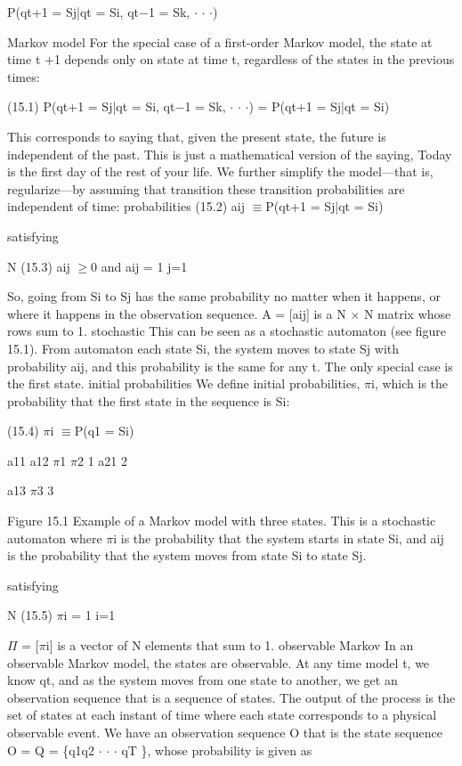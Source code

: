 P(qt+1 = Sj|qt = Si, qt$-$1 = Sk, $\cdot$ $\cdot$ $\cdot$)

Markov model For the special case of a first-order Markov model, the state at time t +1 depends only on state at time t, regardless of the states in the previous times:

(15.1) P(qt+1 = Sj|qt = Si, qt$-$1 = Sk, $\cdot$ $\cdot$ $\cdot$) = P(qt+1 = Sj|qt = Si)

This corresponds to saying that, given the present state, the future is independent of the past. This is just a mathematical version of the saying, Today is the first day of the rest of your life. We further simplify the model---that is, regularize---by assuming that transition these transition probabilities are independent of time: probabilities (15.2) aij $\equiv$P(qt+1 = Sj|qt = Si)

satisfying

N (15.3) aij $\geq$0 and aij = 1 j=1

So, going from Si to Sj has the same probability no matter when it happens, or where it happens in the observation sequence. A = [aij] is a N $\times$ N matrix whose rows sum to 1. stochastic This can be seen as a stochastic automaton (see figure 15.1). From automaton each state Si, the system moves to state Sj with probability aij, and this probability is the same for any t. The only special case is the first state. initial probabilities We define initial probabilities, $\pi$i, which is the probability that the first state in the sequence is Si:

(15.4) $\pi$i $\equiv$P(q1 = Si)

a11 a12 $\pi$1 $\pi$2 1 a21 2

a13 $\pi$3 3

Figure 15.1 Example of a Markov model with three states. This is a stochastic automaton where $\pi$i is the probability that the system starts in state Si, and aij is the probability that the system moves from state Si to state Sj.

satisfying

N (15.5) $\pi$i = 1 i=1

$\Pi$ = [$\pi$i] is a vector of N elements that sum to 1. observable Markov In an observable Markov model, the states are observable. At any time model t, we know qt, and as the system moves from one state to another, we get an observation sequence that is a sequence of states. The output of the process is the set of states at each instant of time where each state corresponds to a physical observable event. We have an observation sequence O that is the state sequence O = Q = \{q1q2 $\cdot$ $\cdot$ $\cdot$ qT \}, whose probability is given as

